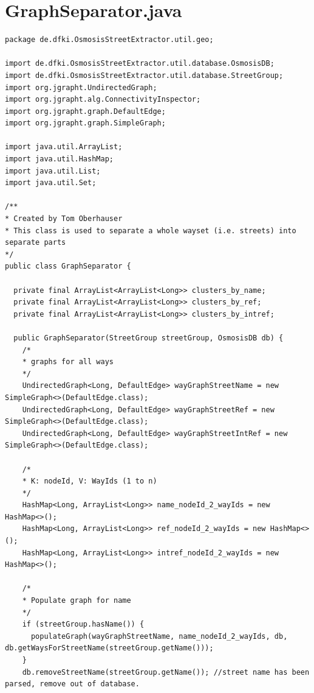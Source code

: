 \section{GraphSeparator.java}
\label{sec:appenix:ose:graphseparator}
\begin{lstlisting}
package de.dfki.OsmosisStreetExtractor.util.geo;

import de.dfki.OsmosisStreetExtractor.util.database.OsmosisDB;
import de.dfki.OsmosisStreetExtractor.util.database.StreetGroup;
import org.jgrapht.UndirectedGraph;
import org.jgrapht.alg.ConnectivityInspector;
import org.jgrapht.graph.DefaultEdge;
import org.jgrapht.graph.SimpleGraph;

import java.util.ArrayList;
import java.util.HashMap;
import java.util.List;
import java.util.Set;

/**
* Created by Tom Oberhauser
* This class is used to separate a whole wayset (i.e. streets) into separate parts
*/
public class GraphSeparator {
  
  private final ArrayList<ArrayList<Long>> clusters_by_name;
  private final ArrayList<ArrayList<Long>> clusters_by_ref;
  private final ArrayList<ArrayList<Long>> clusters_by_intref;
  
  public GraphSeparator(StreetGroup streetGroup, OsmosisDB db) {
    /*
    * graphs for all ways
    */
    UndirectedGraph<Long, DefaultEdge> wayGraphStreetName = new SimpleGraph<>(DefaultEdge.class);
    UndirectedGraph<Long, DefaultEdge> wayGraphStreetRef = new SimpleGraph<>(DefaultEdge.class);
    UndirectedGraph<Long, DefaultEdge> wayGraphStreetIntRef = new SimpleGraph<>(DefaultEdge.class);
    
    /*
    * K: nodeId, V: WayIds (1 to n)
    */
    HashMap<Long, ArrayList<Long>> name_nodeId_2_wayIds = new HashMap<>();
    HashMap<Long, ArrayList<Long>> ref_nodeId_2_wayIds = new HashMap<>();
    HashMap<Long, ArrayList<Long>> intref_nodeId_2_wayIds = new HashMap<>();
    
    /*
    * Populate graph for name
    */
    if (streetGroup.hasName()) {
      populateGraph(wayGraphStreetName, name_nodeId_2_wayIds, db, db.getWaysForStreetName(streetGroup.getName()));
    }
    db.removeStreetName(streetGroup.getName()); //street name has been parsed, remove out of database.
    

\end{lstlisting}
